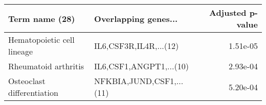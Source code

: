\begin{tabular}{llr}
\toprule
            Term name (28) &     Overlapping genes... &  Adjusted p-value \\
\midrule
Hematopoietic cell lineage &   IL6,CSF3R,IL4R,...(12) &          1.51e-05 \\
      Rheumatoid arthritis &  IL6,CSF1,ANGPT1,...(10) &          2.93e-04 \\
Osteoclast differentiation & NFKBIA,JUND,CSF1,...(11) &          5.20e-04 \\
\bottomrule
\end{tabular}
